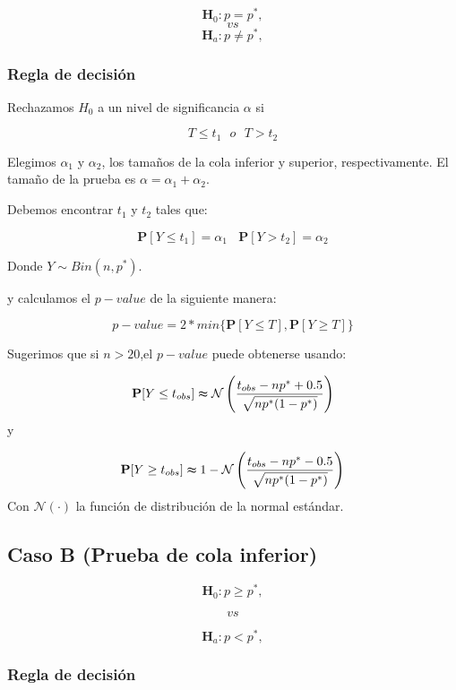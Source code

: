 \documentclass[
  a4paper,
  oneside,
  openany]{book}
\begin{document}
\[\textbf{H}_0: p = p^*,\]
\[vs\]
\[\textbf{H}_a: p \neq p^*,\]

\hypertarget{regla-de-decisiuxf3n}{%
\subsubsection*{Regla de decisión}\label{regla-de-decisiuxf3n}}


Rechazamos \(H_0\) a un nivel de significancia \(\alpha\) si

\[T \leq t_{1} \ \ \ o \ \ \ T > t_{2}\]

Elegimos \(\alpha_{1}\) y \(\alpha_{2}\), los tamaños de la cola inferior y superior, respectivamente. El tamaño de la prueba es \(\alpha=\alpha_{1}+\alpha_{2}\).

Debemos encontrar \(t_{1}\) y \(t_{2}\) tales que:

\[\mathbf{P}[Y \leq t_{1}]=\alpha_{1} \ \ \ \ \mathbf{P}[Y > t_{2}]=\alpha_{2}\]

Donde \(Y \sim Bin (n,p^*)\).

y calculamos el \(p-value\) de la siguiente manera:

\[p-value=2*min \{ \mathbf{P}[Y\leq T],\mathbf{P}[Y \geq T] \}\]

Sugerimos que si \(n > 20\),el \(p-value\) puede obtenerse usando:

\[\mathbf{P}[Y\leq t_{obs}] \thickapprox \mathcal{N} \left(\frac{t_{obs}-np^*+0.5}{\sqrt{np^*(1-p^*)}}\right)\]
y

\[\mathbf{P}[Y\geq t_{obs}] \thickapprox 1-\mathcal{N} \left(\frac{t_{obs}-np^*-0.5}{\sqrt{np^*(1-p^*)}}\right)\]
Con \(\mathcal{N}(\cdot)\) la función de distribución de la normal estándar.

\hypertarget{caso-b-prueba-de-cola-inferior}{%
\subsection*{Caso B (Prueba de cola inferior)}\label{caso-b-prueba-de-cola-inferior}}


\[\textbf{H}_0: p  \geq p^*,\]

\[vs\]

\[\textbf{H}_a: p <p^*,\]

\hypertarget{regla-de-decisiuxf3n-1}{%
\subsubsection*{Regla de decisión}\label{regla-de-decisiuxf3n-1}}
\end{document}
